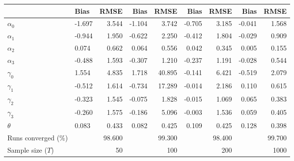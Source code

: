 
\begin{tabular}[t]{llrrrrrrr}
\toprule
  & Bias & RMSE & Bias & RMSE & Bias & RMSE & Bias & RMSE\\
\midrule
$\alpha_{0}$ & -1.697 & 3.544 & -1.104 & 3.742 & -0.705 & 3.185 & -0.041 & 1.568\\
$\alpha_{1}$ & -0.944 & 1.950 & -0.622 & 2.250 & -0.412 & 1.804 & -0.029 & 0.909\\
$\alpha_{2}$ & 0.074 & 0.662 & 0.064 & 0.556 & 0.042 & 0.345 & 0.005 & 0.155\\
$\alpha_{3}$ & -0.488 & 1.593 & -0.307 & 1.210 & -0.237 & 1.191 & -0.028 & 0.544\\
$\gamma_{0}$ & 1.554 & 4.835 & 1.718 & 40.895 & -0.141 & 6.421 & -0.519 & 2.079\\
$\gamma_{1}$ & -0.512 & 1.614 & -0.734 & 17.289 & -0.014 & 2.186 & 0.110 & 0.615\\
$\gamma_{2}$ & -0.323 & 1.545 & -0.075 & 1.828 & -0.015 & 1.069 & 0.065 & 0.383\\
$\gamma_{3}$ & -0.260 & 1.575 & -0.186 & 5.096 & -0.003 & 1.536 & 0.059 & 0.405\\
$\theta$ & 0.083 & 0.433 & 0.082 & 0.425 & 0.109 & 0.425 & 0.128 & 0.398\\
Runs converged (\%) &  & 98.600 &  & 99.300 &  & 98.400 &  & 99.700\\
Sample size ($T$) &  & 50 &  & 100 &  & 200 &  & 1000\\
\bottomrule
\end{tabular}

